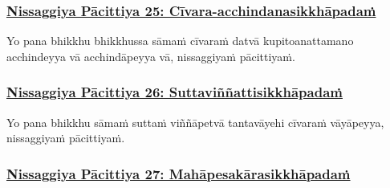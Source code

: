 {
\subsubsection*{\hyperref[forf-exp25]{Nissaggiya Pācittiya 25: Cīvara-acchindanasikkhāpadaṁ}}
\label{np25}

Yo pana bhikkhu bhikkhussa sāmaṁ cīvaraṁ datvā kupito\makeatletter\hyperlink{endnote208-appendix}\makeatother \thinspace anattamano acchindeyya vā acchindāpeyya vā, nissaggiyaṁ pācittiyaṁ.



\subsubsection*{\hyperref[forf-exp26]{Nissaggiya Pācittiya 26: Suttaviññattisikkhāpadaṁ}}
\label{np26}

Yo pana bhikkhu sāmaṁ suttaṁ viññāpetvā tantavāyehi cīvaraṁ vāyāpeyya, nissaggiyaṁ pācittiyaṁ.



\subsubsection*{\hyperref[forf-exp27]{Nissaggiya Pācittiya 27: Mahāpesakārasikkhāpadaṁ}}
\label{np27}

}
